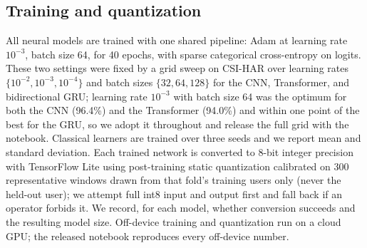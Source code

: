 \documentclass{ieeeaccess}
\begin{document}
\begin{table}[t]
\caption{Datasets used, spanning three CSI receiver families and subject counts from three to thirty-five. ``Subjects'' is n/r where the public split is at the window level and not subject-labeled. CSI-Bench is used only for the many-user cross-subject check (Section~\ref{sec:results-gap}); NTU-Fi\_HAR only for the frontier check (Supplementary Material).}
\label{tab:datasets}
\centering
\footnotesize
\setlength{\tabcolsep}{3pt}
\end{table}

\subsection{Training and quantization}
All neural models are trained with one shared pipeline: Adam at learning rate $10^{-3}$, batch size 64, for 40 epochs, with sparse categorical cross-entropy on logits. These two settings were fixed by a grid sweep on CSI-HAR over learning rates $\{10^{-2},10^{-3},10^{-4}\}$ and batch sizes $\{32,64,128\}$ for the CNN, Transformer, and bidirectional GRU; learning rate $10^{-3}$ with batch size 64 was the optimum for both the CNN (96.4\%) and the Transformer (94.0\%) and within one point of the best for the GRU, so we adopt it throughout and release the full grid with the notebook. Classical learners are trained over three seeds and we report mean and standard deviation. Each trained network is converted to 8-bit integer precision with TensorFlow Lite using post-training static quantization calibrated on 300 representative windows drawn from that fold's training users only (never the held-out user); we attempt full int8 input and output first and fall back if an operator forbids it. We record, for each model, whether conversion succeeds and the resulting model size. Off-device training and quantization run on a cloud GPU; the released notebook reproduces every off-device number.
\end{document}
